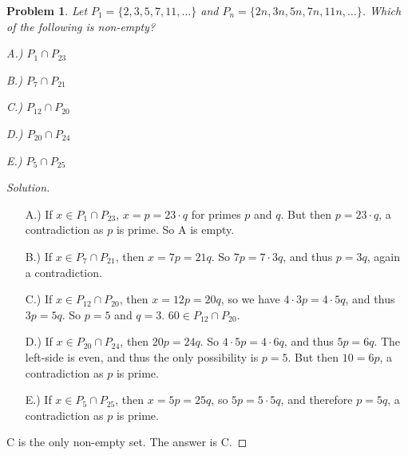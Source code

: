 \documentclass[12pt,oneside]{book}
\theoremstyle{mystyle}
\newtheorem{problem}{Problem}[section]
\begin{document}
\begin{problem}
Let $P_1 = \{2,3,5,7,11,\hdots\}$ and $P_n = \{2n,3n,5n,7n,11n,\hdots\}$. Which of the following is non-empty?
\begin{enumerate}
\begin{multicols}{5}
    \item[A.)] $P_1\cap P_{23}$
    \item[B.)] $P_7\cap P_{21}$
    \item[C.)] $P_{12}\cap P_{20}$
    \item[D.)] $P_{20}\cap P_{24}$
    \item[E.)] $P_{5}\cap P_{25}$
\end{multicols}
\end{enumerate}
\end{problem}
\begin{proof}[Solution]
\
\begin{enumerate}
    \item[A.)] If $x\in P_{1}\cap P_{23}$, $x = p = 23\cdot q$ for primes $p$ and $q$. But then $p = 23\cdot q$, a contradiction as $p$ is prime. So A is empty.
    \item[B.)] If $x\in P_{7}\cap P_{21}$, then $x= 7p = 21q$. So $7p = 7\cdot 3q$, and thus $p = 3q$, again a contradiction.
    \item[C.)] If $x\in P_{12}\cap P_{20}$, then $x = 12p = 20q$, so we have $4\cdot 3 p = 4\cdot 5 q$, and thus $3p = 5q$. So $p=5$ and $q = 3$. $60 \in P_{12}\cap P_{20}$.
    \item[D.)] If $x\in P_{20}\cap P_{24}$, then $20p = 24q$. So $4\cdot 5p = 4\cdot 6q$, and thus $5p = 6q$. The left-side is even, and thus the only possibility is $p=5$. But then $10 = 6p$, a contradiction as $p$ is prime.
    \item[E.)] If $x\in P_{5}\cap P_{25}$, then $x = 5p = 25q$, so $5p = 5\cdot 5q$, and therefore $p=5q$, a contradiction as $p$ is prime.
\end{enumerate}
C is the only non-empty set. The answer is C.
\end{proof}
\end{document}
